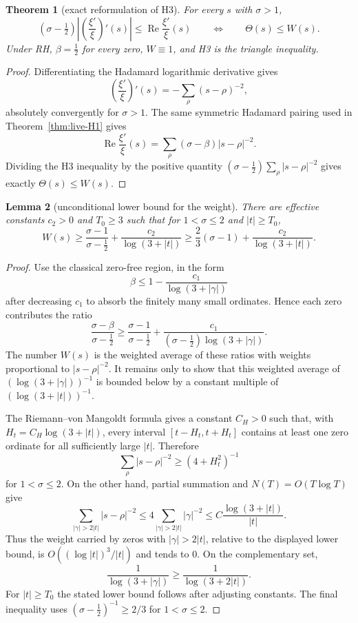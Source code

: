 \documentclass[11pt]{amsart}
\newtheorem{theorem}{Theorem}[section]
\newtheorem{lemma}[theorem]{Lemma}
\theoremstyle{definition}
\theoremstyle{remark}
\theoremstyle{definition}
\renewcommand{\Re}{\operatorname{Re}}
\newcommand{\half}{\tfrac{1}{2}}
\begin{document}
\begin{theorem}[exact reformulation of H3]\label{thm:H3-theta}
For every $s$ with $\sigma>1$,
\[
   (\sigma-\half)\left|\left(\frac{\xi'}{\xi}\right)'(s)\right|
   \le
   \Re\frac{\xi'}{\xi}(s)
   \qquad\Longleftrightarrow\qquad
   \Theta(s)\le W(s).
\]
Under RH, $\beta=\half$ for every zero, $W\equiv1$, and H3 is the triangle inequality.
\end{theorem}

\begin{proof}
Differentiating the Hadamard logarithmic derivative gives
\[
   \left(\frac{\xi'}{\xi}\right)'(s)
   =
   -\sum_\rho(s-\rho)^{-2},
\]
absolutely convergently for $\sigma>1$.  The same symmetric Hadamard pairing used in
Theorem~\ref{thm:live-H1} gives
\[
   \Re\frac{\xi'}{\xi}(s)
   =
   \sum_\rho(\sigma-\beta)|s-\rho|^{-2}.
\]
Dividing the H3 inequality by the positive quantity
$(\sigma-\half)\sum_\rho|s-\rho|^{-2}$ gives exactly $\Theta(s)\le W(s)$.
\end{proof}

\begin{lemma}[unconditional lower bound for the weight]\label{lem:weight-lower}
There are effective constants $c_2>0$ and $T_0\ge3$ such that for
$1<\sigma\le2$ and $|t|\ge T_0$,
\[
   W(s)\ge
   \frac{\sigma-1}{\sigma-\half}
   +
   \frac{c_2}{\log(3+|t|)}
   \ge
   \frac23(\sigma-1)+\frac{c_2}{\log(3+|t|)}.
\]
\end{lemma}

\begin{proof}
Use the classical zero-free region, in the form
\[
   \beta\le 1-\frac{c_1}{\log(3+|\gamma|)}
\]
after decreasing $c_1$ to absorb the finitely many small ordinates.  Hence each zero contributes the
ratio
\[
   \frac{\sigma-\beta}{\sigma-\half}
   \ge
   \frac{\sigma-1}{\sigma-\half}
   +
   \frac{c_1}{(\sigma-\half)\log(3+|\gamma|)}.
\]
The number $W(s)$ is the weighted average of these ratios with weights proportional to
 $|s-\rho|^{-2}$.  It remains only to show that this weighted average of
$(\log(3+|\gamma|))^{-1}$ is bounded below by a constant multiple of
$(\log(3+|t|))^{-1}$.

The Riemann--von Mangoldt formula gives a constant $C_H>0$ such that, with
$H_t=C_H\log(3+|t|)$, every interval $[t-H_t,t+H_t]$ contains at least one zero ordinate for all
sufficiently large $|t|$.  Therefore
\[
   \sum_\rho|s-\rho|^{-2}\ge (4+H_t^2)^{-1}
\]
for $1<\sigma\le2$.  On the other hand, partial summation and $N(T)=O(T\log T)$ give
\[
   \sum_{|\gamma|>2|t|}|s-\rho|^{-2}
   \le
   4\sum_{|\gamma|>2|t|}|\gamma|^{-2}
   \le
   C\frac{\log(3+|t|)}{|t|}.
\]
Thus the weight carried by zeros with $|\gamma|>2|t|$, relative to the displayed lower bound, is
 $O((\log|t|)^3/|t|)$ and tends to $0$.  On the complementary set,
\[
   \frac1{\log(3+|\gamma|)}
   \ge
   \frac1{\log(3+2|t|)}.
\]
For $|t|\ge T_0$ the stated lower bound follows after adjusting constants.  The final inequality uses
$(\sigma-\half)^{-1}\ge 2/3$ for $1<\sigma\le2$.
\end{proof}
\end{document}
